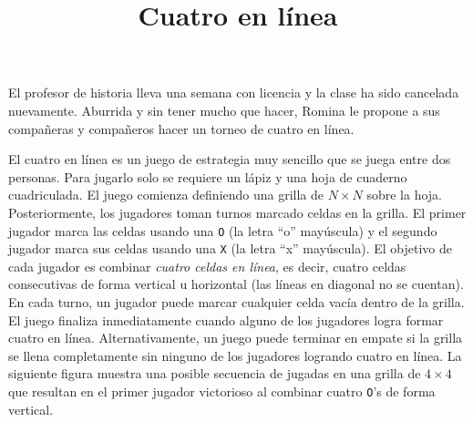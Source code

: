 \documentclass{oci}
\title{Cuatro en línea}
\begin{document}
\begin{problemDescription}
  El profesor de historia lleva una semana con
  licencia y la clase ha sido cancelada nuevamente.
  Aburrida y sin tener mucho que hacer, Romina le
  propone a sus compañeras y compañeros hacer un torneo
  de cuatro en línea.

  El cuatro en línea es un juego de estrategia
  muy sencillo que se juega entre dos personas.
  Para jugarlo solo se requiere un lápiz y una hoja de
  cuaderno cuadriculada.
  El juego comienza definiendo una grilla de
  $N\times N$ sobre la hoja.
  Posteriormente, los jugadores toman turnos
  marcado celdas en la grilla.
  El primer jugador marca las celdas usando una
  \texttt{O} (la letra ``o'' mayúscula)
  y el segundo jugador marca sus celdas usando una
  \texttt{X} (la letra ``x'' mayúscula).
  El objetivo de cada jugador es combinar \emph{cuatro celdas
  en línea}, es decir, cuatro celdas consecutivas de forma
  vertical u horizontal (las líneas en diagonal no se cuentan).
  En cada turno, un jugador puede marcar cualquier celda vacía
  dentro de la grilla.
  El juego finaliza inmediatamente cuando alguno de los jugadores
  logra formar cuatro en línea.
  Alternativamente, un juego puede terminar en empate si la grilla
  se llena completamente sin ninguno de los jugadores logrando
  cuatro en línea.
  La siguiente figura muestra una posible secuencia de jugadas
  en una grilla de $4\times 4$ que resultan en el primer jugador
  victorioso al combinar cuatro \texttt{O}'s de forma vertical.
  \begin{center}
\end{center}
\end{problemDescription}
\end{document}
